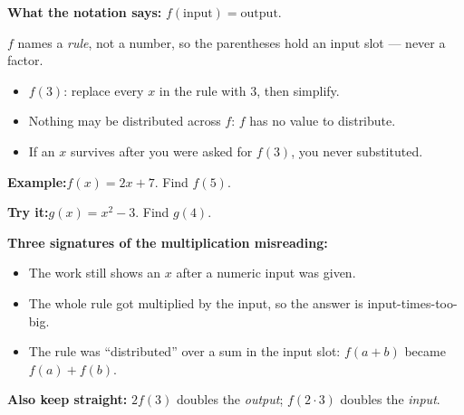 \documentclass[12pt]{article}
\begin{document}


\begin{formulabox}
\textbf{What the notation says:} $f(\text{input}) = \text{output}$.\par
$f$ names a \emph{rule}, not a number, so the parentheses hold an input slot --- never a factor.
\begin{itemize}[leftmargin=0.8cm, itemsep=0pt, topsep=1pt]
  \item $f(3)$: replace every $x$ in the rule with $3$, then simplify.
  \item Nothing may be distributed across $f$: $f$ has no value to distribute.
  \item If an $x$ survives after you were asked for $f(3)$, you never substituted.
\end{itemize}
\end{formulabox}

\begin{examplebox}
\textbf{Example:}\quad $f(x) = 2x + 7$. Find $f(5)$.
\end{examplebox}

\begin{tryitbox}
\textbf{Try it:}\quad $g(x) = x^2 - 3$. Find $g(4)$.\\[2pt]
\end{tryitbox}


\begin{formulabox}
\textbf{Three signatures of the multiplication misreading:}
\begin{itemize}[leftmargin=0.8cm, itemsep=0pt, topsep=1pt]
  \item The work still shows an $x$ after a numeric input was given.
  \item The whole rule got multiplied by the input, so the answer is input-times-too-big.
  \item The rule was ``distributed'' over a sum in the input slot: $f(a+b)$ became $f(a)+f(b)$.
\end{itemize}
\textbf{Also keep straight:} $2f(3)$ doubles the \emph{output}; $f(2 \cdot 3)$ doubles the \emph{input}.
\end{formulabox}
\end{document}
